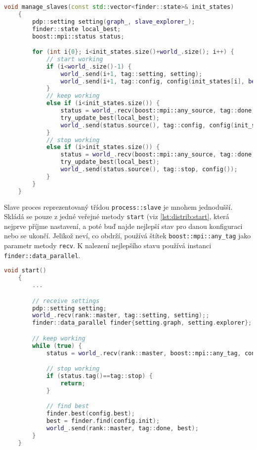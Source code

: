 \begin{lstlisting}[language=C++, label={lst:distrib:manage_slaves}, title={Metoda pro obstarání slave procesů}]
    void manage_slaves(const std::vector<finder::state>& init_states)
    {
        pdp::setting setting(graph_, slave_explorer_);
        finder::state local_best;
        boost::mpi::status status;

        for (int i{0}; i<init_states.size()+world_.size(); i++) {
            // start working
            if (i<world_.size()-1) {
                world_.send(i+1, tag::setting, setting);
                world_.send(i+1, tag::config, config(init_states[i], best_));
            }
            // keep working
            else if (i<init_states.size()) {
                status = world_.recv(boost::mpi::any_source, tag::done, local_best);
                try_update_best(local_best);
                world_.send(status.source(), tag::config, config(init_states[i], best_));
            }
            // stop working
            else if (i>init_states.size()) {
                status = world_.recv(boost::mpi::any_source, tag::done, local_best);
                try_update_best(local_best);
                world_.send(status.source(), tag::stop, config());
            }
        }
    }
\end{lstlisting}

Slave proces reprezentovaný třídou \texttt{process::slave} je mnohem jednodušší.
Skládá se pouze z jedné veřejné metody \texttt{start} (viz \ref{lst:distrib:start}, která nejprve příjme nastavení, a poté buď najde nejlepší stav pro danou konfiguraci nebo se ukončí.
Jelikož neví, co obdrží, používá štítek \texttt{boost::mpi::any\_tag} jako parametr metody \texttt{recv}.
K nalezení nejlepšího stavu používá instanci \texttt{finder::data\_parallel}.

\begin{lstlisting}[language=C++, label={lst:distrib:start}, title={Hlavní metoda třídy slave procesu}]
    void start()
    {
        ...

        // receive settings
        pdp::setting setting;
        world_.recv(rank::master, tag::setting, setting);;
        finder::data_parallel finder{setting.graph, setting.explorer};

        // keep working
        while (true) {
            status = world_.recv(rank::master, boost::mpi::any_tag, config);

            // stop working
            if (status.tag()==tag::stop) {
                return;
            }

            // find best
            finder.best(config.best);
            best = finder.find(config.init);
            world_.send(rank::master, tag::done, best);
        }
    }
\end{lstlisting}





